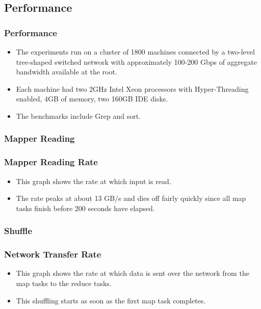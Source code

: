 \documentclass{beamer}
\begin{document}
\subsection{Performance}

\begin{frame}
  \frametitle{Performance} 
  \begin{itemize} 
    \item The experiments run on a cluster of 1800 machines connected
      by a two-level tree-shaped switched network with approximately
      100-200 Gbps of aggregate bandwidth available at the root.
    \item Each machine had two 2GHz Intel Xeon processors with
        Hyper-Threading enabled, 4GB of memory, two 160GB IDE disks.
    \item The benchmarks include Grep and sort.
  \end{itemize}
\end{frame}

\begin{frame}
\frametitle{Mapper Reading}
\centerline{}
\end{frame}

\begin{frame}
  \frametitle{Mapper Reading Rate}
  \begin{itemize}
    \item This graph shows the rate at which input is read. 
    \item The rate peaks at about 13 GB/s and dies off fairly quickly
      since all map tasks finish before 200 seconds have elapsed.
  \end{itemize}
\end{frame}

\begin{frame}
\frametitle{Shuffle}
\centerline{}
\end{frame}

\begin{frame}
  \frametitle{Network Transfer Rate}
  \begin{itemize}
    \item This graph shows the rate at which data is sent over the
      network from the map tasks to the reduce tasks.
    \item This shuffling starts as soon as the first map task
      completes.
  \end{itemize}
\end{frame}
\end{document}
